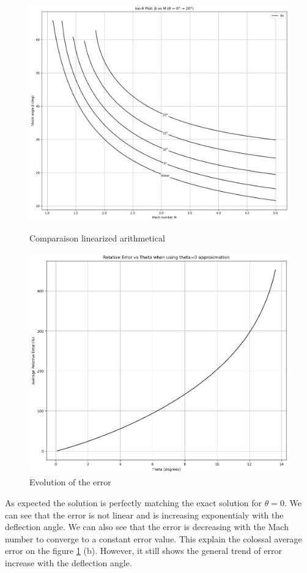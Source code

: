 \begin{figure}[H]
    \centering
    \begin{minipage}[b]{0.45\linewidth}
        \centering
        \includegraphics[width=\linewidth]{ressources/figures/linear_comparaison.png}
		\caption{Comparaison linearized arithmetical}
    \end{minipage}
    \begin{minipage}[b]{0.45\linewidth}
        \centering
        \includegraphics[width=\linewidth]{ressources/figures/linear_error.png}
		\caption{Evolution of the error}
    \end{minipage}
    \label{fig:linear_comparaison}
\end{figure}

As expected the solution is perfectly matching the exact solution for $\theta=0$. We can see that the error is not linear and is increasing exponentialy with the deflection angle. We can also see that the error is decreasing with the Mach number to converge to a constant error value. This explain the colossal average error on the figure \ref{fig:linear_comparaison} (b). However, it still shows the general trend of error increase with the deflection angle.

